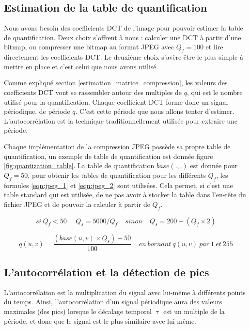 \documentclass[utf8,final]{stageM2R} %
\begin{document}
\subsection{Estimation de la table de quantification}
Nous avons besoin des coefficients DCT de l'image pour pouvoir estimer la table de quantification. Deux choix s'offrent à nous : calculer une DCT à partir d'une bitmap, ou compresser une bitmap au format JPEG avec $Q_f = 100$ et lire directement les coefficients DCT. Le deuxième choix s'avère être le plus simple à mettre en place et c'est celui que nous avons utilisé.

Comme expliqué section \ref{estimation_matrice_compression}, les valeurs des coefficients DCT vont se rassembler autour des multiples de $q$, qui est le nombre utilisé pour la quantification. Chaque coefficient DCT forme donc un signal périodique, de période $q$. C'est cette période que nous allons tenter d'estimer. L'autocorrélation est la technique traditionnellement utilisée pour extraire une période.

Chaque implémentation de la compression JPEG possède sa propre table de quantification, un exemple de table de quantification est donnée figure \ref{fig:quantization_table}. La table de quantification $base(.,.)$ est donnée pour $Q_f = 50$, pour obtenir les tables de quantification pour les différents $Q_f$, les formules \ref{eqn:jpeg_1} et \ref{eqn:jpeg_2} sont utilisées. Cela permet, si c'est une table standard qui est utilisée, de ne pas avoir à stocker la table dans l'en-tête du fichier JPEG et de pouvoir la calculer à partir de $Q_f$.

\begin{equation}
  si\ Q_f < 50\ \ \ \ \ \  Q_s = 5000 / Q_f\ \ \ \ \  sinon\ \ \ \ \ Q_s = 200 - (Q_f \times 2)
  \label{eqn:jpeg_1}
\end{equation}

\begin{equation}
  q(u,v) = \frac{(base(u,v) \times Q_s) - 50}{100}\ \ \ \ \ en\ bornant\ q(u,v)\ par\ 1\ et\ 255
  \label{eqn:jpeg_2}
\end{equation}

\subsection{L'autocorrélation et la détection de pics}
L'autocorrélation est la multiplication du signal avec lui-même à différents points du temps. Ainsi, l'autocorrélation d'un signal périodique aura des valeurs maximales (des pics) lorsque le décalage temporel $\uptau$ est un multiple de la période, et donc que le signal est le plus similaire avec lui-même.
\end{document}
